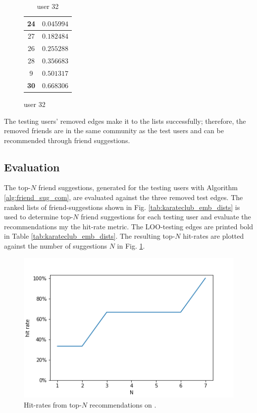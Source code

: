 \documentclass[conference]{IEEEtran}
\begin{document}
\begin{table}
\begin{subfigure}{.4\textwidth}
\begin{tabular}{ c | r }
            \hline
            24          & $0.045994$ \\
            \hline
            27          & $0.182484$ \\
            \hline
            26          & $0.255288$ \\
            \hline
            28          & $0.356683$ \\
            \hline
            9           & $0.501317$ \\
            \hline
            \textbf{30} & $0.668306$ \\
        \end{tabular}
        \caption{user 32}
    \end{subfigure}
\end{table}

The testing users' removed edges make it to the lists successfully; therefore, the removed friends are in the same community as the test users and can be recommended through friend suggestions.

\subsection{Evaluation}

The top-$N$ friend suggestions, generated for the testing users with Algorithm \ref{alg:friend_sug_com}, are evaluated against the three removed test edges.
The ranked lists of friend-suggestions shown in Fig. \ref{tab:karateclub_emb_dists} is used to determine top-$N$ friend suggestions for each testing user and evaluate the recommendations my the hit-rate metric. The LOO-testing edges are printed bold in Table \ref{tab:karateclub_emb_dists}. The resulting top-$N$ hit-rates are plotted against the number of suggestions $N$ in Fig. \ref{fig:karateclub_hitrates}.

\begin{figure}[htbp]
    \centering
    \includegraphics[width=.4\textwidth]{images/karateclub/hit_rates.png}
    \caption{Hit-rates from top-$N$ recommendations on \citet{KarateClubDS}.}
    \label{fig:karateclub_hitrates}
\end{figure}
\end{document}
